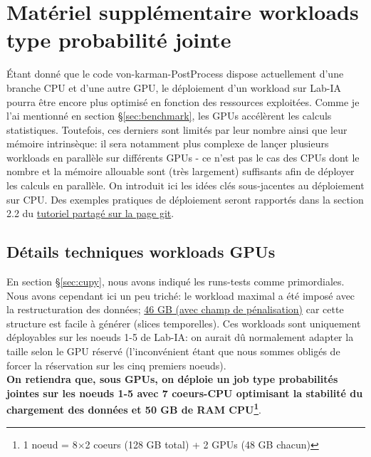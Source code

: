 \documentclass[13pt, a4paper]{extarticle}
\begin{document}
\section{Matériel supplémentaire workloads type probabilité jointe}
\noindent Étant donné que le code von-karman-PostProcess dispose actuellement d'une
branche CPU et d'une autre GPU, le déploiement d'un workload sur Lab-IA pourra 
être encore plus optimisé en fonction des ressources exploitées. Comme je l'ai
mentionné en section \S \ref{sec:benchmark},
les GPUs accélèrent les calculs statistiques. Toutefois, ces derniers
sont limités par leur nombre ainsi que leur mémoire intrinsèque: il sera notamment plus complexe
de lançer plusieurs workloads en parallèle sur différents GPUs - ce n'est pas le cas
des CPUs dont le nombre et la mémoire allouable sont (très largement) suffisants
afin de déployer les calculs en parallèle. On introduit ici les idées clés sous-jacentes au
déploiement sur CPU. Des exemples pratiques de déploiement seront rapportés
dans la section 2.2 du \href{https://gitlab.lisn.upsaclay.fr/allaglo/von-karman-postprocess/-/blob/main/tutorials/tutorial.ipynb}
{tutoriel partagé sur la page git}. 

\subsection{Détails techniques workloads GPUs}\label{sec:tech_workloads}
\noindent En section \S \ref{sec:cupy}, nous avons indiqué
les runs-tests comme primordiales. Nous avons cependant ici un peu triché: 
le workload maximal a été imposé avec la restructuration des données; \ul{46 GB (avec 
champ de p\'enalisation)} car cette structure est facile à 
générer (slices temporelles). Ces workloads sont uniquement déployables sur les
noeuds 1-5 de Lab-IA: on aurait dû normalement adapter la taille selon 
le GPU réservé (l'inconvénient étant que nous sommes obligés de forcer la réservation 
sur les cinq premiers noeuds). \\
{\bf On retiendra que, sous GPUs, on déploie un job type probabilités jointes sur les noeuds
1-5 avec 7 coeurs-CPU optimisant la stabilité du chargement des données
et 50 GB de RAM CPU\footnote{1 noeud = 8$\times$2 coeurs (128 GB total) + 2 GPUs (48 GB chacun)}}.
\end{document}
